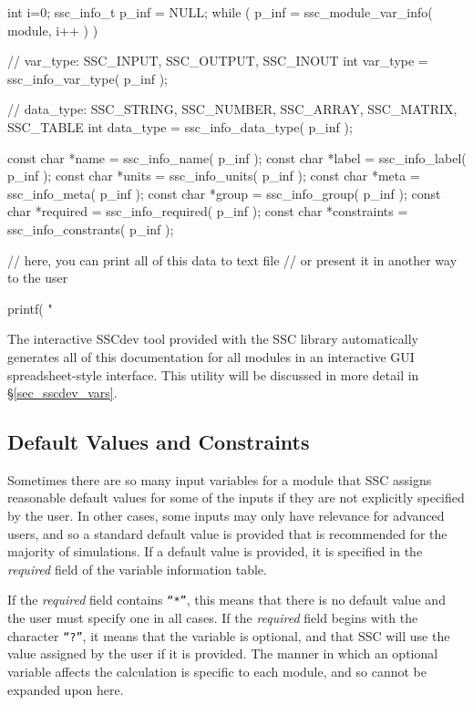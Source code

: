 \documentclass{article}
\begin{document}
\begin{verbatimtab}[4]
int i=0;
ssc_info_t p_inf = NULL;
while ( p_inf = ssc_module_var_info( module, i++ ) )
{
	// var_type: SSC_INPUT, SSC_OUTPUT, SSC_INOUT
	int var_type = ssc_info_var_type( p_inf );

	// data_type: SSC_STRING, SSC_NUMBER, SSC_ARRAY, SSC_MATRIX, SSC_TABLE   
	int data_type = ssc_info_data_type( p_inf );
      
	const char *name = ssc_info_name( p_inf );
	const char *label = ssc_info_label( p_inf );
	const char *units = ssc_info_units( p_inf );
	const char *meta = ssc_info_meta( p_inf );
	const char *group = ssc_info_group( p_inf );
	const char *required = ssc_info_required( p_inf );
	const char *constraints = ssc_info_constrants( p_inf );

	// here, you can print all of this data to text file
	// or present it in another way to the user

	printf( "%
}

\end{verbatimtab}

The interactive SSCdev tool provided with the SSC library automatically generates all of this documentation for all modules in an interactive GUI spreadsheet-style interface.  This utility will be discussed in more detail in \S\ref{sec_sscdev_vars}.

\subsection{Default Values and Constraints}
\label{sec_def_const}

Sometimes there are so many input variables for a module that SSC assigns reasonable default values for some of the inputs if they are not explicitly specified by the user.  In other cases, some inputs may only have relevance for advanced users, and so a standard default value is provided that is recommended for the majority of simulations.  If a default value is provided, it is specified in the \emph{required} field of the variable information table.

If the \emph{required} field contains \texttt{``*''}, this means that there is no default value and the user must specify one in all cases.  If the \emph{required} field begins with the character \texttt{``?''}, it means that the variable is optional, and that SSC will use the value assigned by the user if it is provided.  The manner in which an optional variable affects the calculation is specific to each module, and so cannot be expanded upon here.
\end{document}
